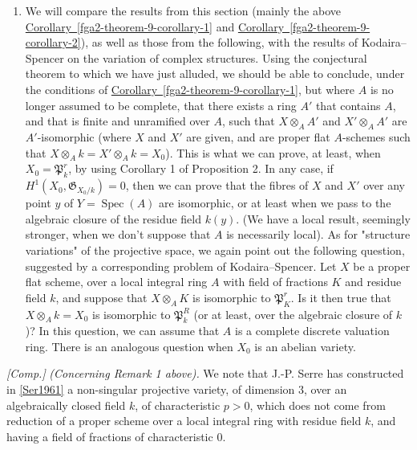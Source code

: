 \begin{remarks}{}
\begin{enumerate}
    \item{}We will compare the results from this section (mainly the above \hyperref[fga2-theorem-9-corollary-1]{Corollary~\ref*{fga2-theorem-9-corollary-1}} and \hyperref[fga2-theorem-9-corollary-2]{Corollary~\ref*{fga2-theorem-9-corollary-2}}), as well as those from the following, with the results of Kodaira–Spencer on the variation of complex structures.
      Using the conjectural theorem to which we have just alluded, we should be able to conclude, under the conditions of \hyperref[fga2-theorem-9-corollary-1]{Corollary~\ref*{fga2-theorem-9-corollary-1}}, but where \(A\) is no longer assumed to be complete, that there exists a ring \(A'\) that contains \(A\), and that is finite and unramified over \(A\), such that \(X\otimes _AA'\) and \(X'\otimes _AA'\) are \(A'\)-isomorphic (where \(X\) and \(X'\) are given, and are proper flat \(A\)-schemes such that \(X\otimes _Ak=X'\otimes _Ak=X_0\)).
      This is what we can prove, at least, when \(X_0=\mathfrak {P}_k^r\), by using Corollary 1 of Proposition 2.
      In any case, if \(H^1(X_0,\mathfrak {G}_{X_0/k})=0\), then we can prove that the fibres of \(X\) and \(X'\) over any point \(y\) of \(Y=\operatorname {Spec}(A)\) are isomorphic, or at least when we pass to the algebraic closure of the residue field \(k(y)\).
      (We have a local result, seemingly stronger, when we don't suppose that \(A\) is necessarily local).
      As for "structure variations" of the projective space, we again point out the following question, suggested by a corresponding problem of Kodaira–Spencer.
      Let \(X\) be a proper flat scheme, over a local integral ring \(A\) with field of fractions \(K\) and residue field \(k\), and suppose that \(X\otimes _AK\) is isomorphic to \(\mathfrak {P}_K^r\).
      Is it then true that \(X\otimes _Ak=X_0\) is isomorphic to \(\mathfrak {P}_k^R\) (or at least, over the algebraic closure of \(k\))?
      In this question, we can assume that \(A\) is a complete discrete valuation ring.
      There is an analogous question when \(X_0\) is an abelian variety.\end{enumerate}\end{remarks}\begin{remark}{}\label{fga2-6-remark-i}\skipsinglepar\par{}\emph{[Comp.]}
    \emph{(Concerning Remark 1 above).}
    We note that J.-P. Serre has constructed in \hyperref[Ser1961]{[Ser1961]} a non-singular projective variety, of dimension \(3\), over an algebraically closed field \(k\), of characteristic \(p>0\), which does not come from reduction of a proper scheme over a local integral ring with residue field \(k\), and having a field of fractions of characteristic \(0\).

\end{remark}
